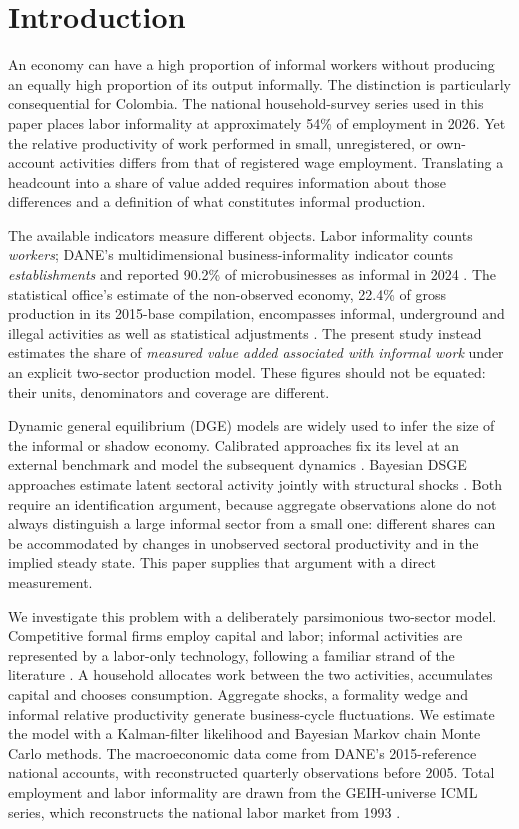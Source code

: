 \section{Introduction}
\label{sec:introduction}

An economy can have a high proportion of informal workers without producing an equally high proportion of its output informally. The distinction is particularly consequential for Colombia. The national household-survey series used in this paper places labor informality at approximately 54\% of employment in 2026. Yet the relative productivity of work performed in small, unregistered, or own-account activities differs from that of registered wage employment. Translating a headcount into a share of value added requires information about those differences and a definition of what constitutes informal production.

The available indicators measure different objects. Labor informality counts \emph{workers}; DANE's multidimensional business-informality indicator counts \emph{establishments} and reported 90.2\% of microbusinesses as informal in 2024 \citep{DANE_IMIE}. The statistical office's estimate of the non-observed economy, 22.4\% of gross production in its 2015-base compilation, encompasses informal, underground and illegal activities as well as statistical adjustments \citep{DANE_SIECI}. The present study instead estimates the share of \emph{measured value added associated with informal work} under an explicit two-sector production model. These figures should not be equated: their units, denominators and coverage are different.

Dynamic general equilibrium (DGE) models are widely used to infer the size of the informal or shadow economy. Calibrated approaches fix its level at an external benchmark and model the subsequent dynamics \citep{ElginOztunali2012,SolisGarciaXie2017}. Bayesian DSGE approaches estimate latent sectoral activity jointly with structural shocks \citep{OrsiRaggiTurino2014}. Both require an identification argument, because aggregate observations alone do not always distinguish a large informal sector from a small one: different shares can be accommodated by changes in unobserved sectoral productivity and in the implied steady state. This paper supplies that argument with a direct measurement.

We investigate this problem with a deliberately parsimonious two-sector model. Competitive formal firms employ capital and labor; informal activities are represented by a labor-only technology, following a familiar strand of the literature \citep{IhrigMoe2004,ElginOztunali2012}. A household allocates work between the two activities, accumulates capital and chooses consumption. Aggregate shocks, a formality wedge and informal relative productivity generate business-cycle fluctuations. We estimate the model with a Kalman-filter likelihood and Bayesian Markov chain Monte Carlo methods. The macroeconomic data come from DANE's 2015-reference national accounts, with reconstructed quarterly observations before 2005. Total employment and labor informality are drawn from the GEIH-universe ICML series, which reconstructs the national labor market from 1993 \citep{VeraJaramillo2025ICML,VeraJaramillo2026Zenodo}.

